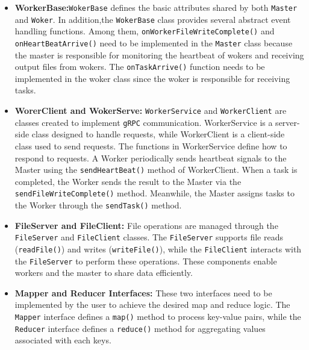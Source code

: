 \begin{itemize}
    \item \textbf{WorkerBase:}\texttt{WokerBase} defines the basic attributes shared by both \texttt{Master} and \texttt{Woker}. In addition,the \texttt{WokerBase} class provides several abstract event handling functions. Among them, \texttt{onWorkerFileWriteComplete()} and \texttt{onHeartBeatArrive()} need to be implemented in the \texttt{Master} class because the master is responsible for monitoring the heartbeat of wokers and receiving output files from wokers. The \texttt{onTaskArrive()} function needs to be implemented in the woker class since the woker is responsible for receiving tasks.
    \item \textbf{WorerClient and WokerServe:} \texttt{WorkerService} and \texttt{WorkerClient} are classes created to implement \texttt{gRPC} communication. WorkerService is a server-side class designed to handle requests, while WorkerClient is a client-side class used to send requests. The functions in WorkerService define how to respond to requests. A Worker periodically sends heartbeat signals to the Master using the \texttt{sendHeartBeat()} method of WorkerClient. When a task is completed, the Worker sends the result to the Master via the \texttt{sendFileWriteComplete()} method. Meanwhile, the Master assigns tasks to the Worker through the \texttt{sendTask()} method.
    \item \textbf{FileServer and FileClient:} File operations are managed through the \texttt{FileServer} and \texttt{FileClient} classes. The \texttt{FileServer} supports file reads (\texttt{readFile()}) and writes (\texttt{writeFile()}), while the \texttt{FileClient} interacts with the \texttt{FileServer} to perform these operations. These components enable workers and the master to share data efficiently.
    \item \textbf{Mapper and Reducer Interfaces:} These two interfaces need to be implemented by the user to achieve the desired map and reduce logic. The \texttt{Mapper} interface defines a \texttt{map()} method to process key-value pairs, while the \texttt{Reducer} interface defines a \texttt{reduce()} method for aggregating values associated with each keys.
\end{itemize}
